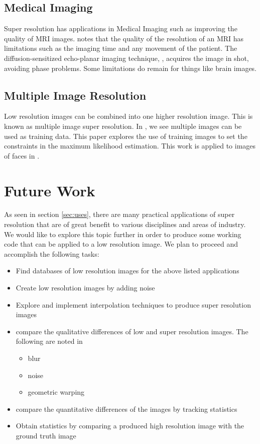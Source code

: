 \documentclass{article}
\begin{document}
\subsection{Medical Imaging}
Super resolution has applications in Medical Imaging such as improving
the quality of MRI images. \cite{Peled} notes that the quality of the resolution of
an MRI has limitations such as the imaging time and any
movement of the patient. The diffusion-sensitized echo-planar imaging
technique, \cite{Peled}, acquires the image in shot, avoiding phase problems. Some
limitations do remain for things like brain images.  


\subsection{Multiple Image Resolution}
Low resolution images can be combined into one higher resolution
image. This is known as multiple image super resolution. In
\cite{CapelMulti}, we see multiple images can be used as training
data. This paper explores the use of training images
to set the constraints in the maximum likelihood estimation. This work
is applied to images of faces in \cite{CapelMulti}.
 
\section{Future Work}
\label{sec:future}
As seen in section \ref{sec:uses}, there are many practical
applications of super resolution that are of great benefit to various
disciplines and areas of industry. We would like to explore this topic
further in order to produce some working code that can be applied to a low
resolution image. We plan to proceed and accomplish the following
tasks:
\begin{itemize}
\item Find databases of low resolution images for the
  above listed applications
  \item Create low resolution images by adding noise
  \item Explore and implement interpolation techniques to produce
    super resolution images
    \item compare the qualitative differences of low and super
      resolution images. The following are noted in \cite{CapelMulti}
      \begin{itemize}
      \item blur
      \item  noise
      \item geometric warping
        
        \end{itemize}
      \item compare the quantitative differences of the images by
        tracking statistics
        \item Obtain statistics by comparing a produced high resolution image with
        the ground truth image 
\end{itemize}


\newpage
\printbibliography
\end{document}
